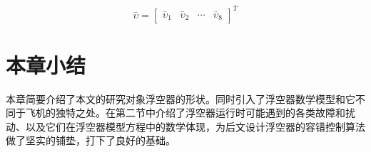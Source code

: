 \begin{equation*}
    \bar{\upsilon} = \left[\begin{matrix}
    \bar{\upsilon}_1&\bar{\upsilon}_2&\cdots&\bar{\upsilon}_8
    \end{matrix}\right]^T
\end{equation*}


\section{本章小结}
本章简要介绍了本文的研究对象浮空器的形状。同时引入了浮空器数学模型和它不同于飞机的独特之处。在第二节中介绍了浮空器运行时可能遇到的各类故障和扰动、以及它们在浮空器模型方程中的数学体现，为后文设计浮空器的容错控制算法做了坚实的铺垫，打下了良好的基础。